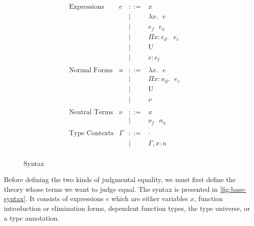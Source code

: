 \documentclass{article}
\newcommand{\bnfdef}{::=}
\newcommand{\bnfalt}{\mid}
\newcommand{\bnfcomment}[1]{}%
\newcommand{\lamE}[2]{\lambda #1. \text{ } #2}
\newcommand{\appE}[2]{#1 \text{ } #2}
\newcommand{\piE}[3]{\Pi #1 : #2. \text{ } #3}
\newcommand{\univE}{\text{U}}
\newcommand{\annE}[2]{#1 : #2}
\begin{document}
\begin{figure}[h]
  \begin{displaymath}
    \begin{array}{lrcll}
      \text{Expressions} & e & \bnfdef & x & \bnfcomment{variables} \\
      & & \bnfalt & \lamE{x}{e} & \bnfcomment{function literal} \\
      & & \bnfalt & \appE{e_f}{e_a} & \bnfcomment{function application} \\
      & & \bnfalt & \piE{x}{e_d}{e_c} & \bnfcomment{dependent function type} \\
      & & \bnfalt & \univE & \bnfcomment{type universe} \\
      & & \bnfalt & \annE{e}{e_t} & \bnfcomment{type annotation} \\
      \\
      \text{Normal Forms} & n & \bnfdef & \lamE{x}{e} & \\
      & & \bnfalt & \piE{x}{n_d}{e_c} & \\
      & & \bnfalt & \univE & \\
      & & \bnfalt & \nu & \\
      \\
      \text{Neutral Terms} & \nu & \bnfdef & x & \\
      & & \bnfalt & \appE{\nu_f}{n_a} & \\
      \\
      \text{Type Contexts} & \Gamma & \bnfdef & \cdot & \\
      & & \bnfalt & \Gamma, x : n & \\
    \end{array}
  \end{displaymath}
  \caption{Syntax}
  \label{fig:base-syntax}
\end{figure}

Before defining the two kinds of judgmental equality, we must first define the theory whose terms we want to judge equal.
The syntax is presented in \autoref{fig:base-syntax}.
It consists of expressions $e$ which are either variables $x$, function introduction or elimination forms, dependent function types, the type universe, or a type annotation.
\end{document}
